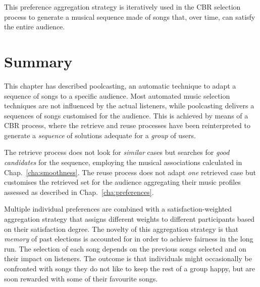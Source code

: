 This preference aggregation strategy is iteratively used in the CBR selection process to generate a musical sequence made of songs that, over time, can satisfy the entire audience.





\section{Summary} %
\label{sec:contributions_c}

This chapter has described poolcasting, an automatic technique to adapt a sequence of songs to a specific audience.
Most automated music selection techniques are not influenced by the actual listeners, while poolcasting delivers a sequences of songs customised for the audience.
This is achieved by means of a CBR process, where the retrieve and reuse processes have been reinterpreted to generate a \emph{sequence} of solutions adequate for a \emph{group} of users.

The retrieve process does not look for \emph{similar} cases but searches for \emph{good candidates} for the sequence, employing the musical associations calculated in Chap.~\ref{cha:smoothness}.
The reuse process does not adapt \emph{one} retrieved case but customises the retrieved set for the audience aggregating their music profiles assessed as described in Chap.~\ref{cha:preferences}.


Multiple individual preferences are combined with a satisfaction-weighted aggregation strategy that assigns different weights to different participants based on their satisfaction degree.
The novelty of this aggregation strategy is that \emph{memory} of past elections is accounted for in order to achieve fairness in the long run.
The selection of each song depends on the previous songs selected and on their impact on listeners.
%
The outcome is that individuals might occasionally be confronted with songs they do not like to keep the rest of a group happy, but are soon rewarded with some of their favourite songs.

